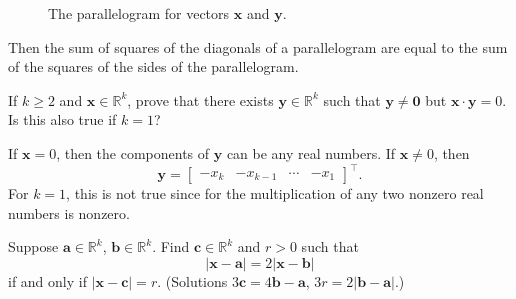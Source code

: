 \begin{exercise}
  \begin{figure}[H]
    \centering
    
    \caption{The parallelogram for vectors \(\mathbold{x}\) and
      \(\mathbold{y}\).}
    \label{ch1prob17}
  \end{figure}
  Then the sum of squares of the diagonals of a parallelogram are equal to the
  sum of the squares of the sides of the parallelogram.
\item
  If \(k\geq 2\) and \(\mathbold{x}\in\mathbb{R}^k\), prove that there exists
  \(\mathbold{y}\in\mathbb{R}^k\) such that \(\mathbold{y}\neq\mathbold{0}\)
  but \(\mathbold{x}\cdot\mathbold{y} = 0\).
  Is this also true if \(k = 1\)?
  \par\smallskip
  If \(\mathbold{x} = 0\), then the components of \(\mathbold{y}\) can be any
  real numbers.
  If \(\mathbold{x}\neq 0\), then
  \[
  \mathbold{y} =
  \begin{bmatrix}
    -x_k & -x_{k - 1} & \cdots & -x_1
  \end{bmatrix}^{\intercal}.
  \]
  For \(k = 1\), this is not true since for the multiplication of any two
  nonzero real numbers is nonzero.
\item
  Suppose \(\mathbold{a}\in\mathbb{R}^k\), \(\mathbold{b}\in\mathbb{R}^k\).
  Find \(\mathbold{c}\in\mathbb{R}^k\) and \(r > 0\) such that
  \[
  \lvert\mathbold{x} - \mathbold{a}\rvert = 2\lvert\mathbold{x} - \mathbold{b}\rvert
  \]
  if and only if \(\lvert\mathbold{x} - \mathbold{c}\rvert = r\).
  (Solutions \(3\mathbold{c} = 4\mathbold{b} - \mathbold{a}\),
  \(3r = 2\lvert\mathbold{b} - \mathbold{a}\rvert\).)
\end{exercise}
